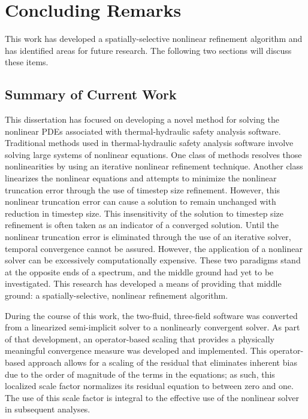 \chapter{Concluding Remarks}
\label{chap:end}
This work has developed a spatially-selective nonlinear refinement algorithm and has identified areas for future research.
The following two sections will discuss these items.

\section{Summary of Current Work}
\label{section:summary}
This dissertation has focused on developing a novel method for solving the nonlinear PDEs associated with thermal-hydraulic safety analysis software.
Traditional methods used in thermal-hydraulic safety analysis software involve solving large systems of nonlinear equations.
One class of methods resolves those nonlinearities by using an iterative nonlinear refinement technique.
Another class linearizes the nonlinear equations and attempts to minimize the nonlinear truncation error through the use of timestep size refinement.
However, this nonlinear truncation error can cause a solution to remain unchanged with reduction in timestep size.
This insensitivity of the solution to timestep size refinement is often taken as an indicator of a converged solution. 
Until the nonlinear truncation error is eliminated through the use of an iterative solver, temporal convergence cannot be assured.
However, the application of a nonlinear solver can be excessively computationally expensive.
These two paradigms stand at the opposite ends of a spectrum, and the middle ground had yet to be investigated.
This research has developed a means of providing that middle ground: a spatially-selective, nonlinear refinement algorithm.

During the course of this work, the two-fluid, three-field software \cobra{} was converted from a linearized semi-implicit solver to a nonlinearly convergent solver.
As part of that development, an operator-based scaling that provides a physically meaningful convergence measure was developed and implemented.
This operator-based approach allows for a scaling of the residual that eliminates inherent bias due to the order of magnitude of the terms in the equations; as such, this localized scale factor normalizes its residual equation to between zero and one.
The use of this scale factor is integral to the effective use of the nonlinear solver in  subsequent analyses.

